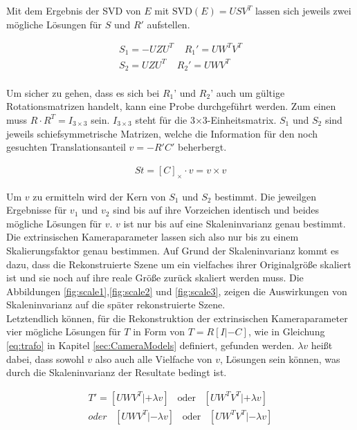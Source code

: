 Mit dem Ergebnis der SVD von $E$ mit \ensuremath{\text{SVD}(E) = USV^T} lassen sich jeweils zwei mögliche Lösungen für $S$ und $R'$ aufstellen\cite{HZ,Ferid}.


\begin{gather}
S_1 = -UZU^T \;\;\;\; R_1' = UW^TV^T\\
S_2 = UZU^T \;\;\;\; R_2' = UWV^T
\end{gather}\\


Um sicher zu gehen, dass es sich bei \ensuremath{R_1}' und \ensuremath{R_2}' auch um gültige Rotationsmatrizen handelt, kann eine Probe durchgeführt werden. Zum einen muss \ensuremath{R\cdot R^T=I_{3\times3}} sein. \ensuremath{I_{3\times3}} steht für die 3$\times$3-Einheitsmatrix.  $S_1$ und $S_2$ sind jeweils schiefsymmetrische Matrizen, welche die Information für den noch gesuchten Translationsanteil $v = -R'C'$ beherbergt\cite{HZ}. 

\begin{gather}
St = [C]_\times \cdot v = v \times v
\end{gather} 

Um $v$ zu ermitteln wird der Kern von $S_1$ und $S_2$ bestimmt. Die jeweilgen Ergebnisse für $v_1$ und $v_2$ sind bis auf ihre Vorzeichen identisch und beides mögliche Lösungen für $v$. $v$ ist nur bis auf eine Skaleninvarianz genau bestimmt. Die extrinsischen Kameraparameter lassen sich also nur bis zu einem Skalierungsfaktor genau bestimmen\cite{HZ,Ferid,phdextrinsicPara}. Auf Grund der Skaleninvarianz kommt es dazu, dass die Rekonstruierte Szene um ein vielfaches ihrer Originalgröße skaliert ist und sie noch auf ihre reale Größe zurück skaliert werden muss. Die Abbildungen \ref{fig:scale1},\ref{fig:scale2} und \ref{fig:scale3}, zeigen die Auswirkungen von Skaleninvarianz auf die später rekonstruierte Szene. \\

Letztendlich können, für die Rekonstruktion der extrinsischen Kameraparameter vier mögliche Lösungen für $T$ in Form von $T = R[I|-C]$, wie in Gleichung \ref{eq:trafo} in Kapitel \ref{sec:CameraModels} definiert, gefunden werden\cite{HZ,Ferid}. $\lambda v$ heißt dabei, dass sowohl $v$ also auch alle Vielfache von $v$, Lösungen sein können, was durch die Skaleninvarianz der Resultate bedingt ist\cite{HZ,Ferid}. 

\begin{gather}
T' = [UWV^T|+\lambda v] \;\;\; \text{oder} \;\;\;[UW^TV^T|+\lambda v]\\
\textit{oder}\;\;\; [UWV^T|-\lambda v] \;\;\; \text{oder} \;\;\;[UW^TV^T|-\lambda v]
\end{gather}

